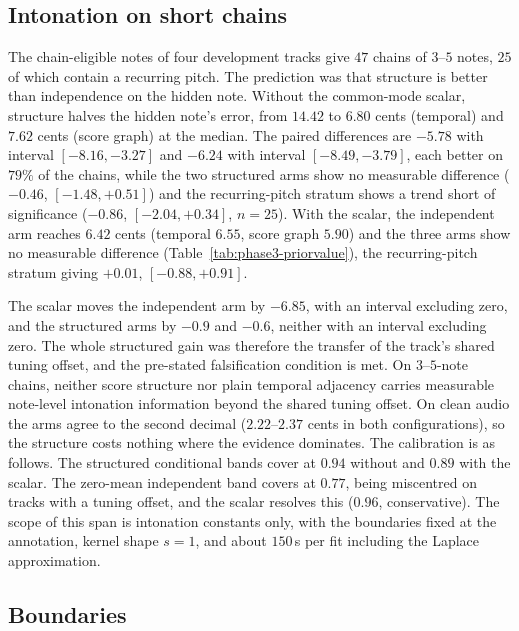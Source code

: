 \subsection{Intonation on short chains}

The chain-eligible notes of four development tracks give $47$ chains of
$3$--$5$ notes, $25$ of which contain a recurring pitch. The prediction was
that structure is better than independence on the hidden note. Without the
common-mode scalar, structure halves the hidden note's error, from $14.42$
to $6.80$ cents (temporal) and $7.62$ cents (score graph) at the median.
The paired differences are $-5.78$ with interval $[-8.16, -3.27]$ and
$-6.24$ with interval $[-8.49, -3.79]$, each better on $79\%$ of the
chains, while the two structured arms show no measurable difference
($-0.46$, $[-1.48, +0.51]$) and the recurring-pitch stratum shows a trend
short of significance ($-0.86$, $[-2.04, +0.34]$, $n=25$). With the scalar,
the independent arm reaches $6.42$ cents (temporal $6.55$, score graph
$5.90$) and the three arms show no measurable difference
(Table~\ref{tab:phase3-priorvalue}), the recurring-pitch stratum giving
$+0.01$, $[-0.88, +0.91]$.

The scalar moves the independent arm by $-6.85$, with an interval excluding
zero, and the structured arms by $-0.9$ and $-0.6$, neither with an
interval excluding zero. The whole structured gain was therefore the
transfer of the track's shared tuning offset, and the pre-stated
falsification condition is met. On $3$--$5$-note chains, neither score
structure nor plain temporal adjacency carries measurable note-level
intonation information beyond the shared tuning offset. On clean audio the
arms agree to the second decimal ($2.22$--$2.37$ cents in both
configurations), so the structure costs nothing where the evidence
dominates. The calibration is as follows. The structured conditional bands
cover at $0.94$ without and $0.89$ with the scalar. The zero-mean
independent band covers at $0.77$, being miscentred on tracks with a tuning
offset, and the scalar resolves this ($0.96$, conservative). The scope of
this span is intonation constants only, with the boundaries fixed at the
annotation, kernel shape $s=1$, and about $150$\,s per fit including the
Laplace approximation.

\subsection{Boundaries}


